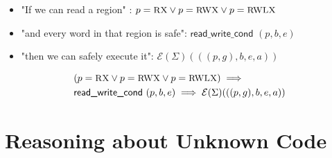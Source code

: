 \documentclass{beamer}
\newcommand{\interp}[2]{(#1)(#2)}
\begin{document}
\begin{frame}
\begin{itemize}
	\item<2-> "If we can read a region" : $p = \textsc{\small RX} \vee p = \textsc{\small RWX} \vee p = \textsc{\small RWLX}$
	\item<3-> "and every word in that region is safe": $\textsf{read\_write\_cond }(p,b,e)$
	\item<4-> "then we can safely execute it": $\mathcal{E}\interp{\Sigma}{((p,g),b,e,a)}$
\end{itemize}

\begin{align*}
	&(p = \textsc{\small RX} \vee p = \textsc{\small RWX} \vee p = \textsc{\small RWLX}) \implies\\
	&\textsf{read\_write\_cond }(p,b,e) \implies \mathcal{E}\interp{\Sigma}{((p,g),b,e,a)}
\end{align*}
\end{frame}

\section{Reasoning about Unknown Code}
\end{document}
